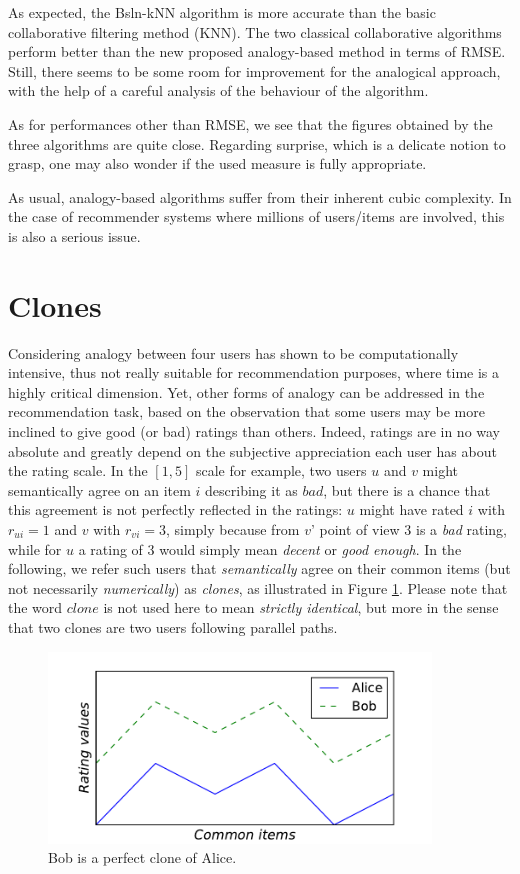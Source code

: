 As expected, the Bsln-kNN algorithm is more accurate than the basic
collaborative filtering method (KNN). The two classical collaborative
algorithms perform better than the new proposed analogy-based method in terms
of RMSE. Still, there seems to be some room for improvement for the analogical
approach, with the help of a careful analysis of the behaviour of the
algorithm.

As for performances other than RMSE, we see that the figures obtained by the
three algorithms are quite close. Regarding surprise, which is a delicate
notion to grasp, one may also wonder if the used measure is fully appropriate.

As usual, analogy-based algorithms suffer from their inherent cubic complexity.
In the case of recommender systems where millions of users/items are involved,
this is also a serious issue.

\section{Clones}

Considering analogy between four users has shown to be computationally
intensive, thus not really suitable for recommendation purposes, where time is
a highly critical dimension. Yet, other forms of analogy can be addressed in
the recommendation task, based on the observation that some users may be more
inclined to give good (or bad) ratings than others. Indeed, ratings are in no
way absolute and greatly depend on the subjective appreciation each user has
about the rating scale. In the $[1, 5]$ scale for example, two users $u$ and
$v$ might semantically agree on an item $i$ describing it as $bad$, but there
is a chance that this agreement is not perfectly reflected in the ratings: $u$
might have rated $i$ with $r_{ui} = 1$ and $v$ with $r_{vi} = 3$, simply
because from $v$' point of view $3$ is a \textit{bad} rating, while for $u$ a
rating of $3$ would simply mean \textit{decent} or \textit{good enough}.  In
the following, we refer such users that \textit{semantically} agree on their
common items (but not necessarily \textit{numerically}) as \textit{clones}, as
illustrated in Figure \ref{FIG_CLONES}. Please note that the word $clone$ is
not used here to mean \textit{strictly identical}, but more in the sense that
two clones are two users following parallel paths.

\begin{figure}[!h]
\centering
\includegraphics[width=4in]{figures/clones.pdf}
\caption{Bob is a perfect clone of Alice.}
\label{FIG_CLONES}
\end{figure}

